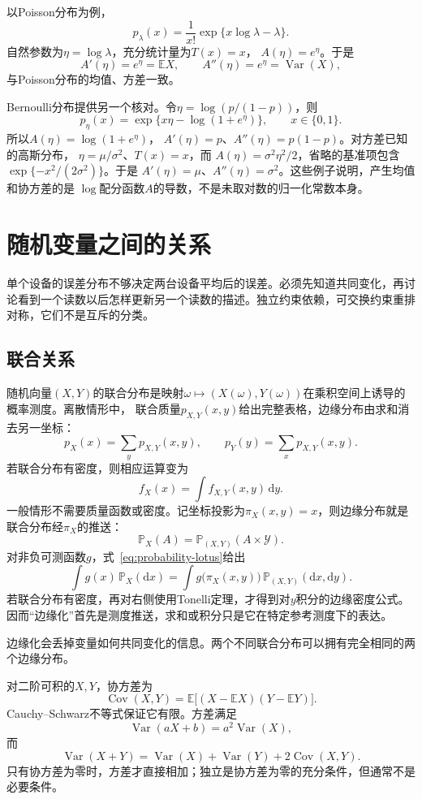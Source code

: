以Poisson分布为例，
\[ p_\lambda(x)
  =\frac{1}{x!}\exp\{x\log\lambda-\lambda\}. \]
自然参数为\(\eta=\log\lambda\)，充分统计量为\(T(x)=x\)，
\(A(\eta)=e^\eta\)。于是
\[ A'(\eta)=e^\eta=\mathbb{E}X,
  \qquad A''(\eta)=e^\eta=\operatorname{Var}(X), \]
与Poisson分布的均值、方差一致。

Bernoulli分布提供另一个核对。令\(\eta=\log(p/(1-p))\)，则
\[
  p_\eta(x)=\exp\{x\eta-\log(1+e^\eta)\},
  \qquad x\in\{0,1\}.
\]
所以\(A(\eta)=\log(1+e^\eta)\)，
\(A'(\eta)=p\)、\(A''(\eta)=p(1-p)\)。对方差已知的高斯分布，
\(\eta=\mu/\sigma^2\)、\(T(x)=x\)，而
\(A(\eta)=\sigma^2\eta^2/2\)，省略的基准项包含
\(\exp\{-x^2/(2\sigma^2)\}\)。于是
\(A'(\eta)=\mu\)、\(A''(\eta)=\sigma^2\)。这些例子说明，产生均值和协方差的是
\(\log\)配分函数\(A\)的导数，不是未取对数的归一化常数本身。

\section{随机变量之间的关系}
\label{sec:rv-relations}
单个设备的误差分布不够决定两台设备平均后的误差。必须先知道共同变化，再讨论看到一个读数以后怎样更新另一个读数的描述。独立约束依赖，可交换约束重排对称，它们不是互斥的分类。

\subsection{联合关系}
\label{sec:rv-joint}
\label{sec:probability-joint-marginal-conditional}
随机向量\((X,Y)\)的联合分布是映射\(\omega\mapsto(X(\omega),Y(\omega))\)在乘积空间上诱导的概率测度。离散情形中，
联合质量\(p_{X,Y}(x,y)\)给出完整表格，边缘分布由求和消去另一坐标：
\[ p_X(x)=\sum_y p_{X,Y}(x,y),
  \qquad p_Y(y)=\sum_x p_{X,Y}(x,y). \]
若联合分布有密度，则相应运算变为
\[ f_X(x)=\int f_{X,Y}(x,y)\,\mathrm{d}y. \]
一般情形不需要质量函数或密度。记坐标投影为\(\pi_X(x,y)=x\)，则边缘分布就是联合分布经\(\pi_X\)的推送：
\[
  \mathbb{P}_X(A)
  =\mathbb{P}_{(X,Y)}(A\times\mathcal{Y}).
\]
对非负可测函数\(g\)，式~\eqref{eq:probability-lotus}给出
\[
  \int g(x)\,\mathbb{P}_X(\mathrm{d}x)
  =
  \int g\bigl(\pi_X(x,y)\bigr)\,
       \mathbb{P}_{(X,Y)}(\mathrm{d}x,\mathrm{d}y).
\]
若联合分布有密度，再对右侧使用Tonelli定理，才得到对\(y\)积分的边缘密度公式。因而“边缘化”首先是测度推送，求和或积分只是它在特定参考测度下的表达。

边缘化会丢掉变量如何共同变化的信息。两个不同联合分布可以拥有完全相同的两个边缘分布。

对二阶可积的\(X,Y\)，协方差为
\[ \operatorname{Cov}(X,Y)
  =\mathbb{E}\bigl[(X-\mathbb{E}X)(Y-\mathbb{E}Y)\bigr]. \]
Cauchy--Schwarz不等式保证它有限。方差满足
\[ \operatorname{Var}(aX+b)=a^2\operatorname{Var}(X), \]
而
\[ \operatorname{Var}(X+Y)
  =\operatorname{Var}(X)+\operatorname{Var}(Y)+2\operatorname{Cov}(X,Y). \]
只有协方差为零时，方差才直接相加；独立是协方差为零的充分条件，但通常不是必要条件。


